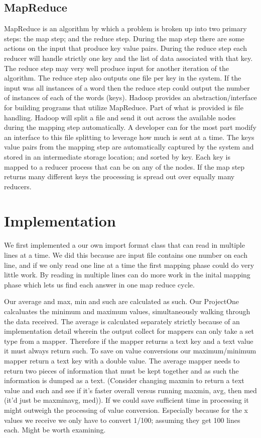 \documentclass[11pt]{article}
\begin{document}
\subsection{MapReduce}
MapReduce is an algorithm by which a problem is broken up into two primary steps: the map step; and the reduce step.  During the map step there are some actions on the input that produce key value pairs.  During the reduce step each reducer will handle strictly one key and the list of data associated with that key.  The reduce step may very well produce input for another iteration of the algorithm.  The reduce step also outputs one file per key in the system.  If the input was all instances of a word then the reduce step could output the number of instances of each of the words (keys).  Hadoop provides an abstraction/interface for building programs that utilize MapReduce.  Part of what is provided is file handling.  Hadoop will split a file and send it out across the available nodes during the mapping step automatically.  A developer can for the most part modify an interface to this file splitting to leverage how much is sent at a time.  The keys value pairs from the mapping step are automatically captured by the system and stored in an intermediate storage location; and sorted by key.  Each key is mapped to a reducer process that can be on any of the nodes.  If the map step returns many different keys the processing is spread out over equally many reducers.

\section{Implementation}
We first implemented a our own import format class that can read in multiple lines at a time.  We did this because are input file contains one number on each line, and if we only read one line at a time the first mapping phase could do very little work.  By reading in multiple lines can do more work in the inital mapping phase which lets us find each answer in one map reduce cycle.

Our average and max, min and such are calculated as such.  Our ProjectOne calcaluates the minimum and maximum values, simultaneously walking through the data received.  The average is calculated separately strictly because of an implementation detail wherein the output collect for mappers can only take a set type from a mapper.  Therefore if the mapper returns a text key and a text value it must always return such.  To save on value conversions our maximum/minimum mapper return a text key with a double value.  The average mapper needs to return two pieces of information that must be kept together and as such the information is dumped as a text.  (Consider changing maxmin to return a text value and such and see if it's faster overall versus running maxmin, avg, then med (it'd just be maxminavg, med)).  If we could save sufficient time in processing it might outweigh the processing of value conversion.  Especially because for the x values we receive we only have to convert 1/100; assuming they get 100 lines each.  Might be worth examining.
\end{document}
